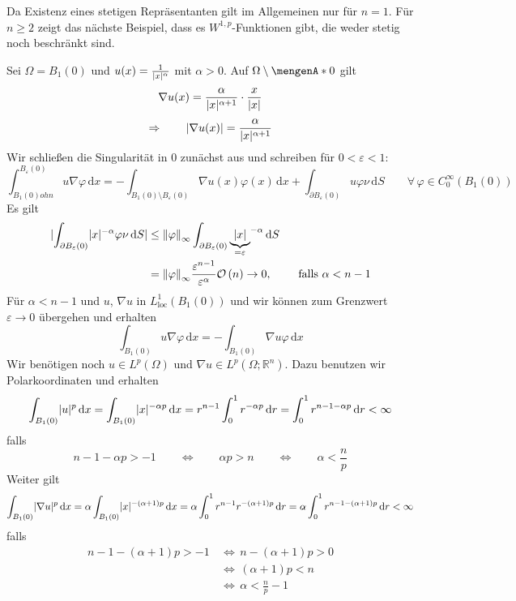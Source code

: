 \begin{bemerkung}
	Da Existenz eines stetigen Repräsentanten gilt im Allgemeinen nur für $n=1$. Für $n \geq 2$ zeigt das nächste Beispiel, dass es $W^{1,p}$-Funktionen gibt, die weder stetig noch beschränkt sind.
\end{bemerkung}
\begin{beispiel}
	Sei $\Omega = B_1(0)$ und $ u (x) = \frac{1}{\lvert x\rvert^\alpha}$ mit $\alpha >0$. Auf $\Omega \setminus \set{0}$ gilt
	\[
		 \nabla u (x) = \frac{\alpha}{\lvert x\rvert^{\alpha + 1}} \cdot \frac{x}{\lvert x\rvert} 
	\]
	\[
		\Rightarrow \qquad \lvert \nabla u(x)\rvert = \frac{\alpha}{\lvert x\rvert^{\alpha +1}}
	\]
	Wir schließen die Singularität in $0$ zunächst aus und schreiben für $0 < \varepsilon <1$:
	\[
		\int_{B_1(0) ohn}^{B_\varepsilon(0)} u  \nabla \varphi \,\mathrm{d}x = - \int_{B_1(0) \setminus B_\varepsilon(0)}^{}  \nabla u(x) \varphi(x) \,\mathrm{d}x
		+ \int_{\partial B_\varepsilon(0)}^{} u \varphi \nu \,\mathrm{d}S \qquad \forall\, \varphi \in C^{\infty}_0(B_1(0))
	\]
	Es gilt
	\begin{align*}
		\abs{\int_{\partial B_\varepsilon(0)}^{}\abs{x}^{-\alpha} \varphi \nu \,\mathrm{d}S} &\leq \norm{\varphi}_{\infty} \int_{\partial B_\varepsilon(0)}^{}
		\underset{= \varepsilon}{\underbrace{\abs{x}}}^{-\alpha} \,\mathrm{d}S \\
		& = \norm{\varphi}_\infty \frac{\varepsilon^{n-1}}{\varepsilon^{\alpha}} \mathcal{O}\left(n \right) \to 0, \qquad \text{ falls }\alpha < n -1
	\end{align*}
	Für $\alpha < n-1$ und $u$, $ \nabla u$ in $L^1_{\text{loc}}(B_1(0))$ und wir können zum Grenzwert $\varepsilon \to  0$ übergehen und erhalten
	\[
		\int_{B_1(0)}^{} u  \nabla \varphi \,\mathrm{d}x = - \int_{B_1(0)}^{}  \nabla u \varphi \,\mathrm{d}x
	\]
	Wir benötigen noch $u \in L^p(\Omega)$ und $ \nabla u \in L^p(\Omega; \mathbb{R}^n)$. Dazu benutzen wir Polarkoordinaten und erhalten
	\[
		\int_{B_1(0)}^{} \lvert u\rvert^p \,\mathrm{d}x = \int_{B_1(0)}^{} \lvert x\rvert^{-\alpha p} \,\mathrm{d}x = r^{n-1} \int_{0}^{1} r^{- \alpha p} \,\mathrm{d}r = 
		\int_{0}^{1} r^{n-1-\alpha p} \,\mathrm{d}r < \infty
	\]
	falls 
	\[
		n-1 - \alpha p > -1 \qquad \Leftrightarrow \qquad \alpha p > n \qquad \Leftrightarrow \qquad \alpha < \frac{n}{p}
	\]
	Weiter gilt
	\[
		\int_{B_1(0)}^{} \lvert  \nabla u\rvert^p \,\mathrm{d}x = \alpha \int_{B_1(0)}^{} \lvert x\rvert^{-(\alpha +1)p} \,\mathrm{d}x = \alpha \int_{0}^{1} r^{n-1} r^{-(\alpha+1)p} \,\mathrm{d}r = \alpha \int_{0}^{1} r^{n-1-(\alpha+1)p} \,\mathrm{d}r < \infty
	\]
	falls
	\begin{align*}
		n-1-(\alpha+1)p >-1 \, &\Leftrightarrow  \, n- (\alpha+1)p >0 \\ &\Leftrightarrow \, (\alpha +1)p < n \\
		& \Leftrightarrow \, \alpha < \frac{n}{p}-1 
	\end{align*}
\end{beispiel}
